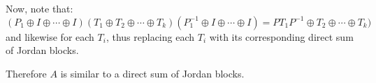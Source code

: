 \documentclass[letterpaper,12pt,fleqn]{article}
\begin{document}
\begin{theproof}
  Now, note that:
  \[(P_1\oplus I\oplus\cdots\oplus I)(T_1\oplus T_2\oplus\cdots\oplus T_k)
  (P_1^{-1}\oplus I\oplus\cdots\oplus I)=
  PT_1P^{-1}\oplus T_2\oplus\cdots\oplus T_k)\]
  and likewise for each $T_i$, thus replacing each $T_i$ with its corresponding
  direct sum of Jordan blocks.

  Therefore $A$ is similar to a direct sum of Jordan blocks.
\end{theproof}
\end{document}
